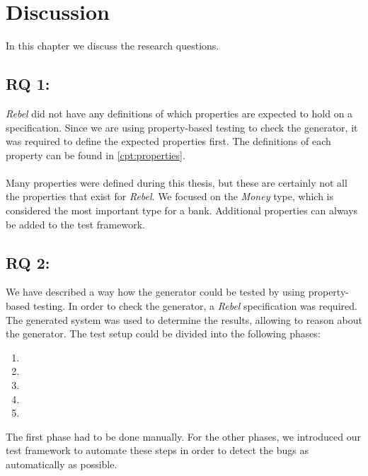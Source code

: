 \chapter{Discussion}
\label{cpt:discussion}
In this chapter we discuss the research questions.

\section{RQ 1: \rqOne{}}
\textit{Rebel} did not have any definitions of which properties are expected to
hold on a specification. Since we are using property-based testing to check the
generator, it was required to define the expected properties first. The
definitions of each property can be found in \autoref{cpt:properties}.\\
\\
Many properties were defined during this thesis, but these are certainly not
all the properties that exist for \textit{Rebel}. We focused on the
\textit{Money} type, which is considered the most important type for a bank.
Additional properties can always be added to the test framework.

\section{RQ 2: \rqTwo{}}
We have described a way how the generator could be tested by using
property-based testing. In order to check the generator, a \textit{Rebel}
specification was required. The generated system was used to determine the
results, allowing to reason about the generator. The test setup could be divided
into the following phases:
\begin{enumerate}
  \item \tfPhaseOne{}
  \item \tfPhaseTwo{}
  \item \tfPhaseThree{}
  \item \tfPhaseFour{}
  \item \tfPhaseFive{}
\end{enumerate}
The first phase had to be done manually. For the other phases, we introduced
our test framework to automate these steps in order to detect the bugs as
automatically as possible.

